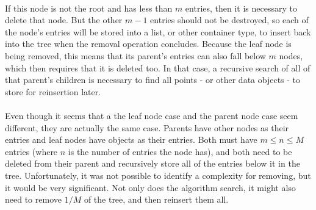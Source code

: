 \documentclass{article}
\begin{document}
\begin{multicols}{2}[]
\paragraph{}
If this node is not the root and has less than $m$ entries, then it is necessary to delete that node. But the other $m - 1$ entries should not be destroyed, so each of the node's entries will be stored into a list, or other container type, to insert back into
the tree when the removal operation concludes. Because the leaf node is being removed, this means that its parent's entries can also fall below
$m$ nodes, which then requires that it is deleted too. In that case, a recursive search of all of that parent's children is necessary
to find all points - or other data objects - to store for reinsertion later.
\paragraph{}
Even though it seems that a the leaf node case and the parent node case seem different, they are actually the same case. Parents have
other nodes as their entries and leaf nodes have objects as their entries. Both must have $m \le n \le M$ entries (where $n$ is the number
of entries the node has), and both need to be deleted from their parent and recursively store all of the entries below it in the tree.
Unfortunately, it was not possible to identify a complexity for removing, but it would be very significant. Not only does the algorithm search, it might also
need to remove $1/M$ of the tree, and then reinsert them all.



\end{multicols}
\end{document}
